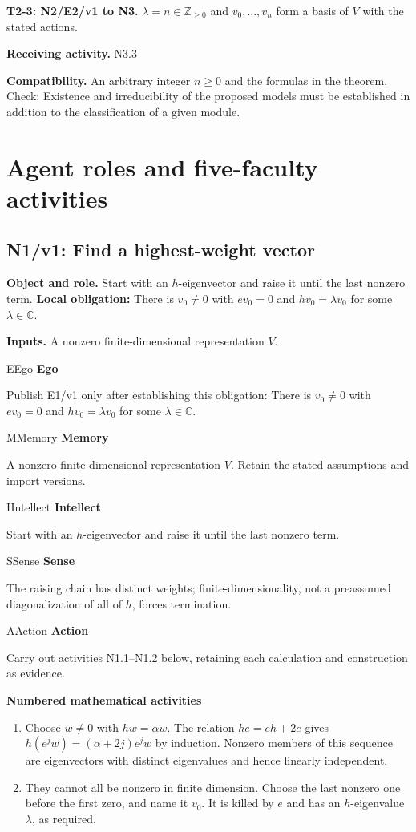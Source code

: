 \documentclass[preprint,12pt,aps,pra,showkeys,amsmath,amssymb,superscriptaddress,floatfix]{revtex4-2}
\theoremstyle{definition}
\theoremstyle{remark}
\newcommand{\mmfaculty}[3]{%
 \begin{mmfacultybox}{#1}{#2}
 {\sffamily\bfseries\color{MMBlue}#2}\par\smallskip #3
 \end{mmfacultybox}}
\newcommand{\field}[2]{\par\smallskip\noindent\textbf{#1.} #2\par}
\begin{document}
\field{T2-3: N2/E2/v1 to N3}{\(\lambda=n\in\mathbb Z_{\ge0}\) and \(v_0,\ldots,v_n\) form a basis of
\(V\) with the stated actions.}

\field{Receiving activity}{N3.3}

\field{Compatibility}{An arbitrary integer \(n\ge0\) and the formulas in the theorem. Check:
Existence and irreducibility of the proposed models must be established
in addition to the classification of a given module.}

\endgroup

\clearpage\section{Agent roles and five-faculty activities}\begingroup\small\linespread{1.05}\selectfont{}

\subsection{N1/v1: Find a highest-weight vector}

\field{Object and role}{Start with an \(h\)-eigenvector and raise it until the last nonzero
term. \textbf{Local obligation:} There is \(v_0\ne0\) with \(ev_0=0\)
and \(hv_0=\lambda v_0\) for some \(\lambda\in\mathbb C\).}

\field{Inputs}{A nonzero finite-dimensional representation \(V\).}

\mmfaculty{E}{Ego}{Publish E1/v1 only after establishing this obligation: There is
\(v_0\ne0\) with \(ev_0=0\) and \(hv_0=\lambda v_0\) for some
\(\lambda\in\mathbb C\).}

\mmfaculty{M}{Memory}{A nonzero finite-dimensional representation \(V\). Retain the stated
assumptions and import versions.}

\mmfaculty{I}{Intellect}{Start with an \(h\)-eigenvector and raise it until the last nonzero
term.}

\mmfaculty{S}{Sense}{The raising chain has distinct weights; finite-dimensionality, not a
preassumed diagonalization of all of \(h\), forces termination.}

\mmfaculty{A}{Action}{Carry out activities N1.1--N1.2 below, retaining each calculation and
construction as evidence.}

\smallskip\noindent\textbf{Numbered mathematical activities}

\begin{enumerate}[label=N1.\arabic*,leftmargin=3.4em]

\item Choose \(w\ne0\) with \(hw=\alpha w\). The relation \(he=eh+2e\) gives
\(h(e^jw)=(\alpha+2j)e^jw\) by induction. Nonzero members of this
sequence are eigenvectors with distinct eigenvalues and hence linearly
independent.

\item They cannot all be nonzero in finite dimension. Choose the last nonzero
one before the first zero, and name it \(v_0\). It is killed by \(e\)
and has an \(h\)-eigenvalue \(\lambda\), as required.

\end{enumerate}
\end{document}
